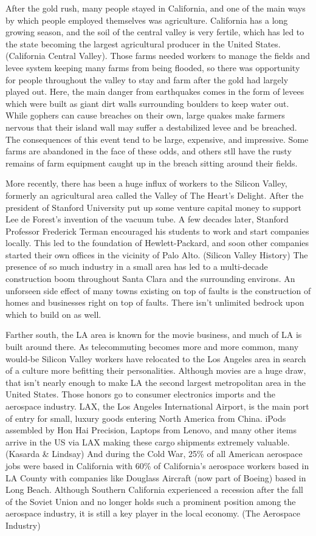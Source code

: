 \documentclass[12pt]{article}
\begin{document}
After the gold rush, many people stayed in California, and one of the main ways by which people employed themselves was agriculture.  California has a long growing season, and the soil of the central valley is very fertile, which has led to the state becoming the largest agricultural producer in the United States. (California Central Valley).  Those farms needed workers to manage the fields and levee system keeping many farms from being flooded, so there was opportunity for people throughout the valley to stay and farm after the gold had largely played out.  Here, the main danger from earthquakes comes in the form of levees which were built as giant dirt walls surrounding boulders to keep water out.  While gophers can cause breaches on their own, large quakes make farmers nervous that their island wall may suffer a destabilized levee and be breached.  The consequences of this event tend to be large, expensive, and impressive.  Some farms are abandoned in the face of these odds, and others stll have the rusty remains of farm equipment caught up in the breach sitting around their fields.

More recently, there has been a huge influx of workers to the Silicon Valley, formerly an agricultural area called the Valley of The Heart's Delight.  After the president of Stanford University put up some venture capital money to support Lee de Forest's invention of the vacuum tube.  A few decades later, Stanford Professor Frederick Terman encouraged his students to work and start companies locally.  This led to the foundation of Hewlett-Packard, and soon other companies started their own offices in the vicinity of Palo Alto. (Silicon Valley History)  The presence of so much industry in a small area has led to a multi-decade construction boom throughout Santa Clara and the surrounding environs.  An unforseen side effect of many towns existing on top of faults is the construction of homes and businesses right on top of faults.  There isn't unlimited bedrock upon which to build on as well.

Farther south, the LA area is known for the movie business, and much of LA is built around there.  As telecommuting becomes more and more common, many would-be Silicon Valley workers have relocated to the Los Angeles area in search of a culture more befitting their personalities.  Although movies are a huge draw, that isn't nearly enough to make LA the second largest metropolitan area in the United States.  Those honors go to consumer electronics imports and the aerospace industry.  LAX, the Los Angeles International Airport, is the main port of entry for small, luxury goods entering North America from China.  iPods assembled by Hon Hai Precision, Laptops from Lenovo, and many other items arrive in the US via LAX making these cargo shipments extremely valuable. (Kasarda \& Lindsay)  And during the Cold War, 25\% of all American aerospace jobs were based in California with 60\% of California's aerospace workers based in LA County with companies like Douglass Aircraft (now part of Boeing) based in Long Beach.  Although Southern California experienced a recession after the fall of the Soviet Union and no longer holds such a prominent position among the aerospace industry, it is still a key player in the local economy. (The Aerospace Industry)
\end{document}

